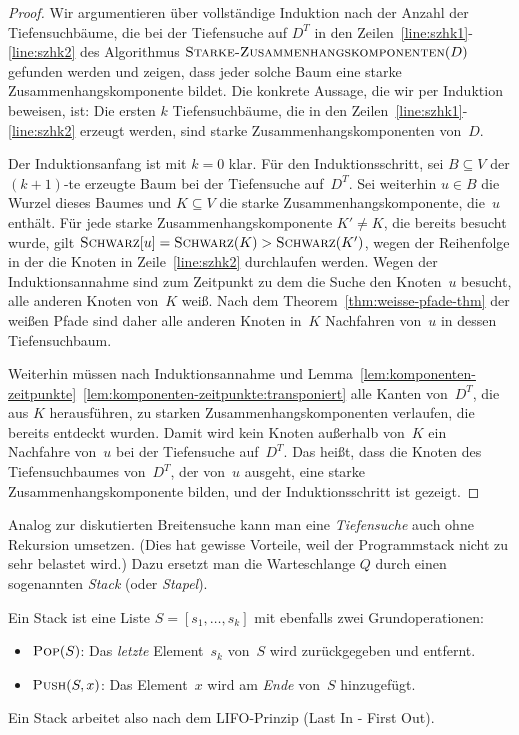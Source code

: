 \begin{proof}
Wir argumentieren über vollständige Induktion nach der Anzahl der Tiefensuchbäume, die bei der Tiefensuche auf $D^T$ in den Zeilen~\ref{line:szhk1}-\ref{line:szhk2} des Algorithmus $\mathop{\text{\textsc{Starke-Zusammenhangskomponenten}}}(D)$ gefunden werden und zeigen, dass jeder solche Baum eine starke Zusammenhangskomponente bildet.
Die konkrete Aussage, die wir per Induktion beweisen, ist: \glqq Die ersten $k$ Tiefensuchbäume, die in den Zeilen~\ref{line:szhk1}-\ref{line:szhk2} erzeugt werden, sind starke Zusammenhangskomponenten von~$D$.\grqq

Der Induktionsanfang ist mit $k=0$ klar.
Für den Induktionsschritt, sei $B \subseteq V$ der $(k+1)$-te erzeugte Baum bei der Tiefensuche auf~$D^T$.
Sei weiterhin $u \in B$ die Wurzel dieses Baumes und $K \subseteq V$ die starke Zusammenhangskomponente, die~$u$ enthält.
Für jede starke Zusammenhangskomponente $K' \neq K$, die bereits besucht wurde, gilt $\mathop{\text{\textsc{Schwarz}}}[u] = \mathop{\text{\textsc{Schwarz}}}(K) > \mathop{\text{\textsc{Schwarz}}}(K')$, wegen der Reihenfolge in der die Knoten in Zeile~\ref{line:szhk2} durchlaufen werden.
Wegen der Induktionsannahme sind zum Zeitpunkt zu dem die Suche den Knoten~$u$ besucht, alle anderen Knoten von~$K$ weiß.
Nach dem Theorem~\ref{thm:weisse-pfade-thm} der weißen Pfade sind daher alle anderen Knoten in~$K$ Nachfahren von~$u$ in dessen Tiefensuchbaum.

Weiterhin müssen nach Induktionsannahme und Lemma~\ref{lem:komponenten-zeitpunkte}~\ref{lem:komponenten-zeitpunkte:transponiert} alle Kanten von~$D^T$, die aus $K$ herausführen, zu starken Zusammenhangskomponenten verlaufen, die bereits entdeckt wurden.
Damit wird kein Knoten außerhalb von~$K$ ein Nachfahre von~$u$ bei der Tiefensuche auf~$D^T$.
Das heißt, dass die Knoten des Tiefensuchbaumes von~$D^T$, der von~$u$ ausgeht, eine starke Zusammenhangskomponente bilden, und der Induktionsschritt ist gezeigt.
\end{proof}

\begin{bem}
	Analog zur diskutierten Breitensuche kann man eine \emph{Tiefensuche} auch ohne Rekursion umsetzen.
	(Dies hat gewisse Vorteile, weil der Programmstack nicht zu sehr belastet wird.)
	Dazu ersetzt man die Warteschlange $Q$ durch einen sogenannten \emph{Stack} (oder \emph{Stapel}). 
	
	Ein Stack ist eine Liste $S=[s_1,\ldots,s_k]$ mit ebenfalls zwei Grundoperationen:
	\begin{itemize}
		\item $\mathop{\text{\textsc{Pop}}}(S)$: Das \emph{letzte} Element~$s_k$ von~$S$ wird zurückgegeben und entfernt.
		
		\item $\mathop{\text{\textsc{Push}}}(S,x)$: Das Element~$x$ wird am \emph{Ende} von~$S$ hinzugefügt.
	\end{itemize}
	
	Ein Stack arbeitet also nach dem LIFO-Prinzip (Last In - First Out).
\end{bem}